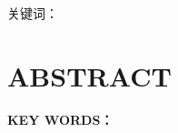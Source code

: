 {%
\noindent
{\hei\sihao 关键词：} \@ckeywords

\clearpage
{}
\chapter*{\centering\erhao\bf{ABSTRACT}}
\thispagestyle{only_foot}%
\@eabstract
\vspace{\baselineskip}

\noindent
{\sihao\textbf{KEY WORDS：}}  \@ekeywords
}

\makeatother
